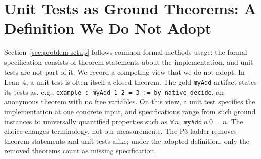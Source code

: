 \section{Unit Tests as Ground Theorems: A Definition We Do Not Adopt}\label{app:spec-vs-tests}
Section~\ref{sec:problem-setup} follows common formal-methods usage: the formal specification consists of theorem statements about the implementation, and unit tests are not part of it.
We record a competing view that we do not adopt.
In Lean~4, a unit test is often itself a closed theorem.
The gold \texttt{myAdd} artifact states its tests as, e.g., \texttt{example : myAdd 1 2 = 3 := by native\_decide}, an anonymous theorem with no free variables.
On this view, a unit test specifies the implementation at one concrete input, and specifications range from such ground instances to universally quantified properties such as \(\forall n,\ \texttt{myAdd}\ n\ 0 = n\).
The choice changes terminology, not our measurements.
The P3 ladder removes theorem statements and unit tests alike; under the adopted definition, only the removed theorems count as missing specification.

